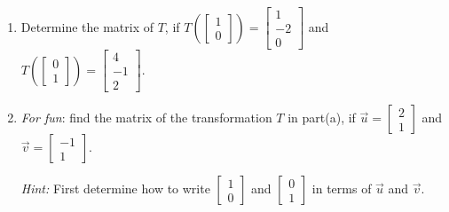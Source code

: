\documentclass[12pt]{article}
\newcommand{\bbm}{\begin{bmatrix}}
\newcommand{\ebm}{\end{bmatrix}}
\begin{document}
\begin{enumerate}
\begin{enumerate}
\vspace{2in}

\item Determine the matrix of $T$, if $T\left(\bbm 1\\0\ebm\right)=\bbm 1\\-2\\0\ebm$ and $T\left(\bbm 0\\1\ebm\right) = \bbm 4\\-1\\2\ebm$.

\vspace{2in}

\item \textit{For fun}: find the matrix of the transformation $T$ in part(a), if $\vec{u}=\bbm 2\\1\ebm$ and $\vec{v}=\bbm -1\\1\ebm$.

\textit{Hint:} First determine how to write $\bbm 1\\0\ebm$ and $\bbm 0\\1\ebm$ in terms of $\vec{u}$ and $\vec{v}$. 
\end{enumerate}

 \end{enumerate}
 
\end{document}
